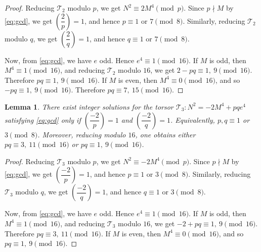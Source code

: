 \documentclass[12pt]{amsart}
\newcommand{\cT}{\mathcal{T}}
\numberwithin{equation}{section}
\newtheorem{lem}{Lemma}[section]
\theoremstyle{definition}
\begin{document}
\begin{proof}
Reducing $\cT_{2}$ modulo $p$, we get $N^{2}\equiv 2M^{4}\pmod p$. Since $p\nmid M$ by \eqref{eq:gcd}, we get $\left(\dfrac{2}{p}\right)=1$, and hence $p\equiv 1$ or $7\pmod 8$. Similarly, reducing $\cT_{2}$ modulo $q$, we get $\left(\dfrac{2}{q}\right)=1$, and hence $q\equiv 1$ or $7\pmod 8$.

Now, from \eqref{eq:gcd}, we have $e$ odd. Hence $e^{4}\equiv 1\pmod {16}$. If $M$ is odd, then $M^{4}\equiv 1\pmod {16}$, and reducing $\cT_{2}$ modulo $16$, we get $2-pq\equiv 1,~9\pmod {16}$. Therefore $pq\equiv 1,~9\pmod {16}$. If $M$ is even, then $M^{4}\equiv 0\pmod {16}$, and so $-pq\equiv 1,~9\pmod {16}$. Therefore $pq\equiv 7,~15\pmod {16}$.
\end{proof}

\smallskip

\begin{lem}
\label{lem:T3}
There exist integer solutions for the torsor $\cT_{3}: N^{2}=-2M^{4}+pqe^{4}$ satisfying \eqref{eq:gcd} only if $\left(\dfrac{-2}{p}\right)=1$ and $\left(\dfrac{-2}{q}\right)=1$. Equivalently, $p,q\equiv 1$ or $3\pmod 8$. Moreover, reducing modulo $16$, one obtains either $pq\equiv 3,~11\pmod {16}$ or $pq\equiv 1,~9\pmod {16}$.
\end{lem}

\begin{proof}
Reducing $\cT_{3}$ modulo $p$, we get $N^{2}\equiv -2M^{4}\pmod p$. Since $p\nmid M$ by \eqref{eq:gcd}, we get $\left(\dfrac{-2}{p}\right)=1$, and hence $p\equiv 1$ or $3\pmod 8$. Similarly, reducing $\cT_{3}$ modulo $q$, we get $\left(\dfrac{-2}{q}\right)=1$, and hence $q\equiv 1$ or $3\pmod 8$.

Now, from \eqref{eq:gcd}, we have $e$ odd. Hence $e^{4}\equiv 1\pmod {16}$. If $M$ is odd, then $M^{4}\equiv 1\pmod {16}$, and reducing $\cT_{3}$ modulo $16$, we get $-2+pq\equiv 1,~9\pmod {16}$. Therefore $pq\equiv 3,~11\pmod {16}$. If $M$ is even, then $M^{4}\equiv 0\pmod {16}$, and so $pq\equiv 1,~9\pmod {16}$.
\end{proof}





\smallskip
\end{document}
